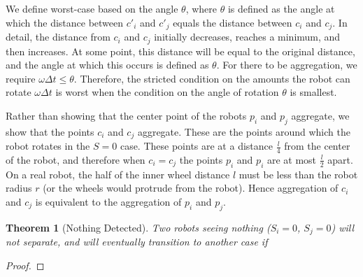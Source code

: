 \documentclass[letterpaper, 10 pt, conference]{ieeeconf}
\newtheorem{theorem}{Theorem}
\begin{document}
We define worst-case based on the angle $\theta$, where $\theta$ is defined as the angle at which the distance between $c'_i$ and $c'_j$ equals the distance between $c_i$ and $c_j$. In detail, the distance from $c_i$ and $c_j$ initially decreases, reaches a minimum, and then increases. At some point, this distance will be equal to the original distance, and the angle at which this occurs is defined as $\theta$. For there to be aggregation, we require $\omega\Delta t \leq \theta$. Therefore, the stricted condition on the amounts the robot can rotate $\omega\Delta t$ is worst when the condition on the angle of rotation $\theta$ is smallest.

Rather than showing that the center point of the robots $p_i$ and $p_j$ aggregate, we show that the points $c_i$ and $c_j$ aggregate. These are the points around which the robot rotates in the $S=0$ case. These points are at a distance $\frac{l}{4}$ from the center of the robot, and therefore when $c_i=c_j$ the points $p_i$ and $p_i$ are at most $\frac{l}{2}$ apart. On a real robot, the half of the inner wheel distance $l$ must be less than the robot radius $r$ (or the wheels would protrude from the robot). Hence aggregation of $c_i$ and $c_j$ is equivalent to the aggregation of $p_i$ and $p_j$.

\begin{theorem}[Nothing Detected]
  Two robots seeing nothing ($S_i=0$, $S_j=0$) will not separate, and will eventually transition to another case if
\end{theorem}
\begin{proof}
\end{proof}
\end{document}
